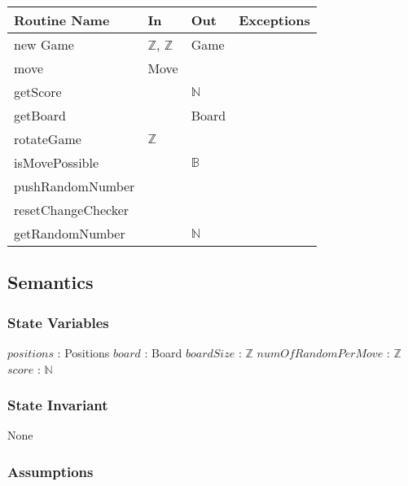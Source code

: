 \documentclass[12pt]{article}
\begin{document}
\begin{tabular}{|l|l|l|l|}
\hline
\textbf{Routine Name} & \textbf{In}               & \textbf{Out} & \textbf{Exceptions} \\ \hline
new Game              & $\mathbb{Z}$, $\mathbb{Z}$ & Game         &                     \\ \hline
move                  & Move                      &              &                     \\ \hline
getScore              &                           & $\mathbb{N}$ &                     \\ \hline
getBoard              &                           & Board        &                     \\ \hline
rotateGame            & $\mathbb{Z}$              &              &                     \\ \hline
isMovePossible        &                           & $\mathbb{B}$ &                     \\ \hline
pushRandomNumber      &                           &              &                     \\ \hline
resetChangeChecker    &                           &              &                     \\ \hline
getRandomNumber       &                           & $\mathbb{N}$ &                     \\ \hline
\end{tabular}

\subsection* {Semantics}

\subsubsection* {State Variables}

$positions$ : Positions
$board$ : Board
$boardSize$ : $\mathbb{Z}$
$numOfRandomPerMove$ : $\mathbb{Z}$
$score$ : $\mathbb{N}$

\subsubsection* {State Invariant}

None

\subsubsection* {Assumptions}
\end{document}
